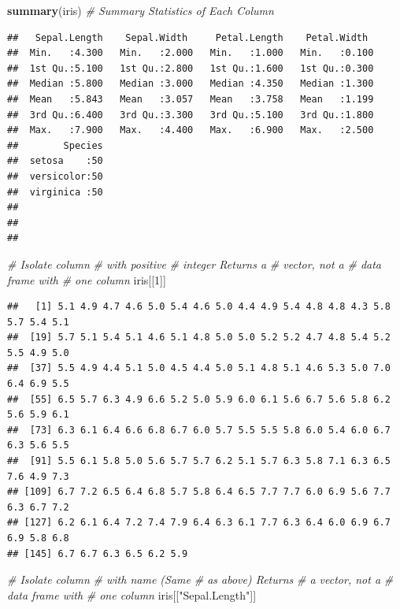 \documentclass[
]{book}
\newenvironment{Shaded}{\begin{snugshade}}{\end{snugshade}}
\newcommand{\CommentTok}[1]{\textcolor[rgb]{0.56,0.35,0.01}{\textit{#1}}}
\newcommand{\DecValTok}[1]{\textcolor[rgb]{0.00,0.00,0.81}{#1}}
\newcommand{\KeywordTok}[1]{\textcolor[rgb]{0.13,0.29,0.53}{\textbf{#1}}}
\newcommand{\NormalTok}[1]{#1}
\newcommand{\StringTok}[1]{\textcolor[rgb]{0.31,0.60,0.02}{#1}}
\begin{document}
\begin{Shaded}
\begin{Highlighting}[]
\KeywordTok{summary}\NormalTok{(iris)  }\CommentTok{# Summary Statistics of Each Column }
\end{Highlighting}
\end{Shaded}

\begin{verbatim}
##   Sepal.Length    Sepal.Width     Petal.Length    Petal.Width   
##  Min.   :4.300   Min.   :2.000   Min.   :1.000   Min.   :0.100  
##  1st Qu.:5.100   1st Qu.:2.800   1st Qu.:1.600   1st Qu.:0.300  
##  Median :5.800   Median :3.000   Median :4.350   Median :1.300  
##  Mean   :5.843   Mean   :3.057   Mean   :3.758   Mean   :1.199  
##  3rd Qu.:6.400   3rd Qu.:3.300   3rd Qu.:5.100   3rd Qu.:1.800  
##  Max.   :7.900   Max.   :4.400   Max.   :6.900   Max.   :2.500  
##        Species  
##  setosa    :50  
##  versicolor:50  
##  virginica :50  
##                 
##                 
## 
\end{verbatim}

\begin{Shaded}
\begin{Highlighting}[]
\CommentTok{# Isolate column}
\CommentTok{# with positive}
\CommentTok{# integer Returns a}
\CommentTok{# vector, not a}
\CommentTok{# data frame with}
\CommentTok{# one column}
\NormalTok{iris[[}\DecValTok{1}\NormalTok{]]}
\end{Highlighting}
\end{Shaded}

\begin{verbatim}
##   [1] 5.1 4.9 4.7 4.6 5.0 5.4 4.6 5.0 4.4 4.9 5.4 4.8 4.8 4.3 5.8 5.7 5.4 5.1
##  [19] 5.7 5.1 5.4 5.1 4.6 5.1 4.8 5.0 5.0 5.2 5.2 4.7 4.8 5.4 5.2 5.5 4.9 5.0
##  [37] 5.5 4.9 4.4 5.1 5.0 4.5 4.4 5.0 5.1 4.8 5.1 4.6 5.3 5.0 7.0 6.4 6.9 5.5
##  [55] 6.5 5.7 6.3 4.9 6.6 5.2 5.0 5.9 6.0 6.1 5.6 6.7 5.6 5.8 6.2 5.6 5.9 6.1
##  [73] 6.3 6.1 6.4 6.6 6.8 6.7 6.0 5.7 5.5 5.5 5.8 6.0 5.4 6.0 6.7 6.3 5.6 5.5
##  [91] 5.5 6.1 5.8 5.0 5.6 5.7 5.7 6.2 5.1 5.7 6.3 5.8 7.1 6.3 6.5 7.6 4.9 7.3
## [109] 6.7 7.2 6.5 6.4 6.8 5.7 5.8 6.4 6.5 7.7 7.7 6.0 6.9 5.6 7.7 6.3 6.7 7.2
## [127] 6.2 6.1 6.4 7.2 7.4 7.9 6.4 6.3 6.1 7.7 6.3 6.4 6.0 6.9 6.7 6.9 5.8 6.8
## [145] 6.7 6.7 6.3 6.5 6.2 5.9
\end{verbatim}

\begin{Shaded}
\begin{Highlighting}[]
\CommentTok{# Isolate column}
\CommentTok{# with name (Same}
\CommentTok{# as above) Returns}
\CommentTok{# a vector, not a}
\CommentTok{# data frame with}
\CommentTok{# one column}
\NormalTok{iris[[}\StringTok{"Sepal.Length"}\NormalTok{]]}
\end{Highlighting}
\end{Shaded}
\end{document}
